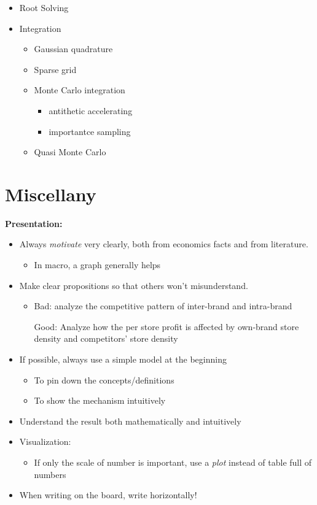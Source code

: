 \documentclass{book}
\theoremstyle{plain}
\theoremstyle{definition}
\begin{document}


\begin{itemize}
	\item Root Solving
	\item Integration
	\begin{itemize}
		\item Gaussian quadrature
		\item Sparse grid
		\item Monte Carlo integration
		\begin{itemize}
			\item antithetic accelerating
			\item importantce sampling
		\end{itemize}
		\item Quasi Monte Carlo
	\end{itemize}
\end{itemize}






\chapter{Miscellany} %
\label{cha:miscellany}

\noindent
\textbf{Presentation:}
\begin{itemize}
	\item Always \textit{motivate} very clearly, both from economics facts and from literature.
	\begin{itemize}
		\item In macro, a graph generally helps
	\end{itemize}
	\item Make clear propositions so that others won't misunderstand.
	\begin{itemize}
		\item Bad: analyze the competitive pattern of inter-brand and intra-brand

		Good: Analyze how the per store profit is affected by own-brand store density and competitors' store density
	\end{itemize}
	\item If possible, always use a simple model at the beginning
	\begin{itemize}
		\item To pin down the concepts/definitions
		\item To show the mechanism intuitively
	\end{itemize}
	\item Understand the result both mathematically and intuitively
	\item Visualization:
	\begin{itemize}
		\item If only the scale of number is important, use a \textit{plot} instead of table full of numbers
	\end{itemize}
	\item When writing on the board, write horizontally!
\end{itemize}
\end{document}

